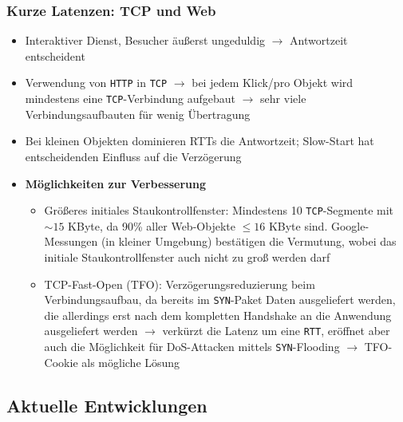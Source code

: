 \subsubsection{Kurze Latenzen: TCP und Web}
\begin{itemize}
	\item Interaktiver Dienst, Besucher äußerst ungeduldig \(\rightarrow\) Antwortzeit entscheident
	\item Verwendung von \texttt{HTTP} in \texttt{TCP} \(\rightarrow\) bei jedem Klick/pro Objekt wird mindestens eine \texttt{TCP}-Verbindung aufgebaut \(\rightarrow\) sehr viele Verbindungsaufbauten für wenig Übertragung
	\item Bei kleinen Objekten dominieren RTTs die Antwortzeit; Slow-Start hat entscheidenden Einfluss auf die Verzögerung
	\item \textbf{Möglichkeiten zur Verbesserung}
	\begin{itemize}
		\item Größeres initiales Staukontrollfenster: Mindestens 10 \texttt{TCP}-Segmente mit \(\sim 15\) KByte, da 90\% aller Web-Objekte \(\le 16\) KByte sind. Google-Messungen (in kleiner Umgebung) bestätigen die Vermutung, wobei das initiale Staukontrollfenster auch nicht zu groß werden darf
		\item TCP-Fast-Open (TFO): Verzögerungsreduzierung beim Verbindungsaufbau, da bereits im \texttt{SYN}-Paket Daten ausgeliefert werden, die allerdings erst nach dem kompletten Handshake an die Anwendung ausgeliefert werden \(\rightarrow\) verkürzt die Latenz um eine \texttt{RTT}, eröffnet aber auch die Möglichkeit für DoS-Attacken mittels \texttt{SYN}-Flooding \(\rightarrow\) TFO-Cookie als mögliche Lösung
	\end{itemize}
\end{itemize}


\subsection{Aktuelle Entwicklungen}

